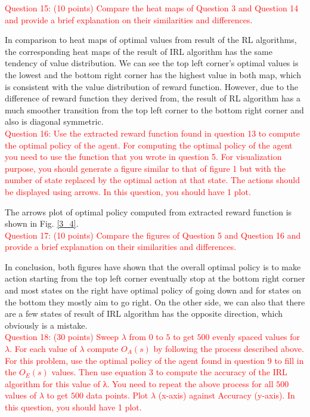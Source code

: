 \documentclass[11pt]{article}
\begin{document}
\textcolor{red}{
    Question 15: (10 points) Compare the heat maps of Question 3 and Question 14 and provide a brief explanation on their similarities and differences.
}

In comparison to heat maps of optimal values from result of the RL algorithms, the corresponding heat maps of the result of IRL algorithm has the same tendency of value distribution. We can see the top left corner's optimal values is the lowest and the bottom right corner has the highest value in both map, which is consistent with the value distribution of reward function. However, due to the difference of reward function they derived from, the result of RL algorithm has a much smoother transition from the top left corner to the bottom right corner and also is diagonal symmetric.\\

\textcolor{red}{
    Question 16: Use the extracted reward function found in question 13 to compute the optimal policy of the agent. For computing the optimal policy of the agent you need to use the function that you wrote in question 5. For visualization purpose, you should generate a figure similar to that of figure 1 but with the number of state replaced by the optimal action at that state. The actions should be displayed using arrows. In this question, you should have 1 plot.
}

The arrows plot of optimal policy computed from extracted reward function is shown in Fig. \ref{3_4}.\\

\textcolor{red}{
    Question 17: (10 points) Compare the figures of Question 5 and Question 16 and provide a brief explanation on their similarities and differences.
}

In conclusion, both figures have shown that the overall optimal policy is to make action starting from the top left corner eventually stop at the bottom right corner and most states on the right have optimal policy of going down and for states on the bottom they mostly aim to go right. On the other side, we can also that there are a few states of result of IRL algorithm has the opposite direction, which obviously is a mistake.\\

\textcolor{red}{
    Question 18: (30 points) Sweep $\lambda$ from $0$ to $5$ to get $500$ evenly spaced values for $\lambda$. For each value of $\lambda$ compute $O_{A}(s)$ by following the process described above. For this problem, use the optimal policy of the agent found in question 9 to fill in the $O_{E}(s)$ values. Then use equation 3 to compute the accuracy of the IRL algorithm for this value of λ. You need to repeat the above process for all $500$ values of $\lambda$ to get $500$ data points. Plot $\lambda$ (x-axis) against Accuracy (y-axis). In this question, you should have 1 plot.
}
\end{document}
